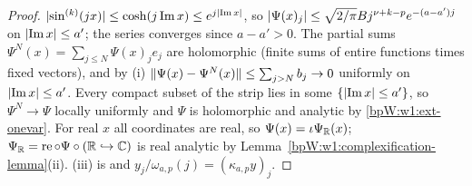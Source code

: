 \begin{proof}
\label{stepW:w1:growth}
$\lvert \sin^{(k)}(jx)\rvert\le\cosh(j\operatorname{Im}x)\le e^{j\lvert \operatorname{Im}x\rvert}$, so
$\lvert \Psi(x)_j\rvert\le\sqrt{2/\pi}Bj^{\nu+k-p}e^{-(a-a')j}$ on $\lvert \operatorname{Im}x\rvert\le a'$; the series converges since
$a-a'>0$.
\label{stepW:w1:normal}
The partial sums $\Psi^N(x)=\sum_{j\le N}\Psi(x)_je_j$ are holomorphic (finite sums of entire functions times fixed
vectors), and by (i) $\lVert \Psi(x)-\Psi^N(x)\rVert\le\sum_{j>N}b_j\to0$ uniformly on $\lvert \operatorname{Im}x\rvert\le a'$. Every
compact subset of the strip lies in some $\{\lvert \operatorname{Im}x\rvert\le a'\}$, so $\Psi^N\to\Psi$ locally uniformly and
$\Psi$ is holomorphic and analytic by \ref{bpW:w1:ext-onevar}.
\label{stepW:w1:sinereal}
For real $x$ all coordinates are real, so $\Psi(x)=\iota\Psi_{\mathbb{R}}(x)$; $\Psi_{\mathbb{R}}=\operatorname{re}\circ\Psi\circ(\mathbb{R}\hookrightarrow\mathbb{C})$
is real analytic by Lemma~\ref{bpW:w1:complexification-lemma}(ii). (iii) is  and
$y_j/\omega_{a,p}(j)=(\kappa_{a,p}y)_j$.
\end{proof}


